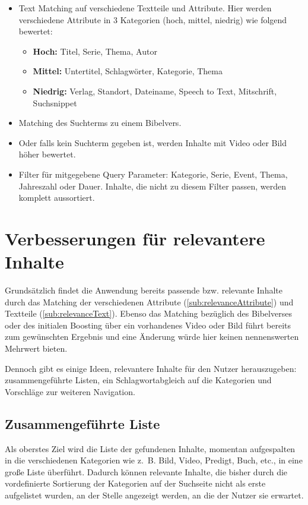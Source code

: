 \begin{itemize}
  \item Text Matching auf verschiedene Textteile und Attribute. Hier werden verschiedene Attribute in 3 Kategorien (hoch, mittel, niedrig) wie folgend bewertet:
  \begin{itemize}
    \item \textbf{Hoch:} Titel, Serie, Thema, Autor
    \item \textbf{Mittel:} Untertitel, Schlagwörter, Kategorie, Thema
    \item \textbf{Niedrig:} Verlag, Standort, Dateiname, Speech to Text, Mitschrift, Suchsnippet
  \end{itemize}
  \item Matching des Suchterms zu einem Bibelvers.
  \item Oder falls kein Suchterm gegeben ist, werden Inhalte mit Video oder Bild höher bewertet.
  \item Filter für mitgegebene Query Parameter: Kategorie, Serie, Event, Thema, Jahreszahl oder Dauer. Inhalte, die nicht zu diesem Filter passen, werden komplett aussortiert.
\end{itemize}

\section{Verbesserungen für relevantere Inhalte}
\label{sec:potential}

Grundsätzlich findet die Anwendung bereits passende bzw. relevante Inhalte durch das Matching der verschiedenen Attribute (\ref{sub:relevanceAttribute}) und Textteile (\ref{sub:relevanceText}).
Ebenso das Matching bezüglich des Bibelverses oder des initialen Boosting über ein vorhandenes Video oder Bild führt bereits zum gewünschten Ergebnis und eine Änderung würde hier keinen nennenswerten Mehrwert bieten.

Dennoch gibt es einige Ideen, relevantere Inhalte für den Nutzer herauszugeben: zusammengeführte Listen, ein Schlagwortabgleich auf die Kategorien und Vorschläge zur weiteren Navigation.

\subsection{Zusammengeführte Liste}
\label{sub:unifiedList}
Als oberstes Ziel wird die Liste der gefundenen Inhalte, momentan aufgespalten in die verschiedenen Kategorien wie z. B. Bild, Video, Predigt, Buch, etc., in eine große Liste überführt.
Dadurch können relevante Inhalte, die bisher durch die vordefinierte Sortierung der Kategorien auf der Suchseite nicht als erste aufgelistet wurden, an der Stelle angezeigt werden, an die der Nutzer sie erwartet.

